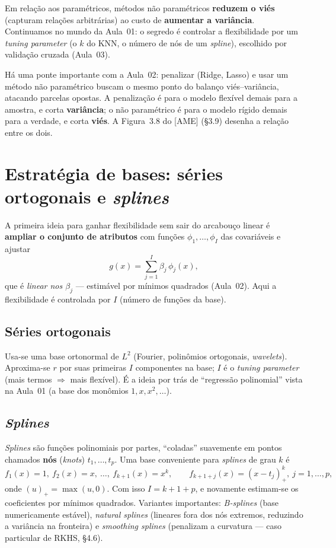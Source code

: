 \documentclass[11pt,a4paper]{article}
\begin{document}
\begin{ideia}
Em relação aos paramétricos, métodos não paramétricos \textbf{reduzem o viés}
(capturam relações arbitrárias) ao custo de \textbf{aumentar a variância}.
Continuamos no mundo da Aula~01: o segredo é controlar a flexibilidade por um
\emph{tuning parameter} (o $k$ do KNN, o número de nós de um \emph{spline}),
escolhido por
validação cruzada (Aula~03).
\end{ideia}

\begin{observacao}
Há uma ponte importante com a Aula~02: penalizar (Ridge, Lasso) e usar um método não
paramétrico buscam o mesmo ponto do balanço viés--variância, atacando parcelas
opostas. A penalização é para o modelo flexível demais para a amostra, e corta
\textbf{variância}; o não paramétrico é para o modelo rígido demais para a verdade,
e corta \textbf{viés}. A Figura~3.8 do [AME] (§3.9) desenha a relação entre os dois.
\end{observacao}

\section{Estratégia de bases: séries ortogonais e \emph{splines}}
A primeira ideia para ganhar flexibilidade sem sair do arcabouço linear é
\textbf{ampliar o conjunto de atributos} com funções $\phi_1,\dots,\phi_I$ das
covariáveis e ajustar
\[
  g(x) = \sum_{j=1}^{I} \beta_j \,\phi_j(x),
\]
que é \emph{linear nos $\beta_j$} --- estimável por mínimos quadrados (Aula~02).
Aqui a flexibilidade é controlada por $I$ (número de funções da base).

\subsection{Séries ortogonais}
Usa-se uma base ortonormal de $L^2$ (Fourier, polinômios ortogonais, \emph{wavelets}).
Aproxima-se $r$ por suas primeiras $I$ componentes na base; $I$ é o \emph{tuning
parameter} (mais termos $\Rightarrow$ mais flexível). É a ideia por trás de
``regressão polinomial'' vista na Aula~01 (a base dos monômios $1,x,x^2,\dots$).

\subsection{\emph{Splines}}
\emph{Splines} são funções polinomiais por partes, ``coladas'' suavemente em
pontos chamados \textbf{nós} (\emph{knots}) $t_1,\dots,t_p$. Uma base conveniente
para \emph{splines} de grau $k$ é
\[
  f_1(x)=1,\ f_2(x)=x,\ \dots,\ f_{k+1}(x)=x^k,\qquad
  f_{k+1+j}(x)=(x-t_j)_+^{k},\ j=1,\dots,p,
\]
onde $(u)_+=\max(u,0)$. Com isso $I=k+1+p$, e novamente estimam-se os
coeficientes por mínimos quadrados. Variantes importantes: \emph{B-splines}
(base numericamente estável), \emph{natural splines} (lineares fora dos nós
extremos, reduzindo a variância na fronteira) e \emph{smoothing splines} (penalizam
a curvatura --- caso particular de RKHS, §4.6).
\end{document}

